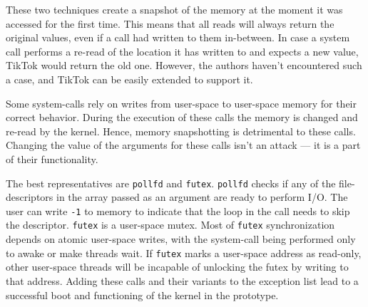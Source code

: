 These two techniques create a snapshot of the memory at the moment it
was accessed for the first time. This means that all reads will always return
the original values, even if a call had written to them in-between. In case a
system call performs a re-read of the location it has written to and expects a
new value, TikTok would return the old one. However, the authors haven't
encountered such a case, and TikTok can be easily extended to support it. 

Some system-calls rely on writes from user-space to user-space memory for their
correct behavior. During the execution of these calls the memory is changed and
re-read by the kernel. Hence, memory snapshotting is detrimental to these calls.
Changing the value of the arguments for these calls isn't an attack --- it is a
part of their functionality.

The best representatives are \texttt{pollfd}\cite{pollfd} and
\texttt{futex}\cite{futex}. \texttt{pollfd} checks if any of the
file-descriptors in the array passed as an argument are ready to perform I/O.
The user can write \texttt{-1} to memory to indicate that the loop in the call
needs to skip the descriptor. \texttt{futex} is a user-space mutex. Most of
\texttt{futex} synchronization depends on atomic user-space writes, with the
system-call being performed only to awake or make threads wait. If
\texttt{futex} marks a user-space address as read-only, other user-space threads
will be incapable of unlocking the futex by writing to that address. Adding
these calls and their variants to the exception list lead to a successful boot
and functioning of the kernel in the prototype.


%

